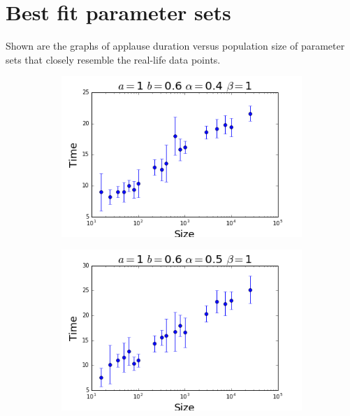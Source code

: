 \newpage
\section{Best fit parameter sets}
\label{apndx:popdep}
Shown are the graphs of applause duration versus population size of parameter sets that closely resemble the real-life data points.

\begin{figure}[h]
  \centering
  \begin{subfigure}[b]{0.4\linewidth}
    \includegraphics[width=\linewidth]{images/appendix/bestfit/confirm1.png}
  \end{subfigure}
  \begin{subfigure}[b]{0.4\linewidth}
    \includegraphics[width=\linewidth]{images/appendix/bestfit/confirm2.png}
  \end{subfigure}
\end{figure}

